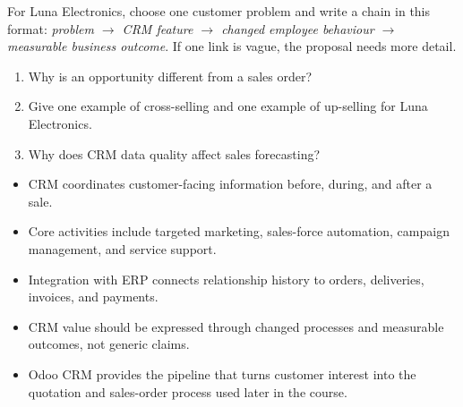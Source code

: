 \begin{tryit}
For Luna Electronics, choose one customer problem and write a chain in this format: \emph{problem $\rightarrow$ CRM feature $\rightarrow$ changed employee behaviour $\rightarrow$ measurable business outcome}. If one link is vague, the proposal needs more detail.
\end{tryit}

\begin{quickcheck}
\begin{enumerate}
  \item Why is an opportunity different from a sales order?
  \item Give one example of cross-selling and one example of up-selling for Luna Electronics.
  \item Why does CRM data quality affect sales forecasting?
\end{enumerate}
\end{quickcheck}

\begin{chapterrecap}
\begin{itemize}
  \item CRM coordinates customer-facing information before, during, and after a sale.
  \item Core activities include targeted marketing, sales-force automation, campaign management, and service support.
  \item Integration with ERP connects relationship history to orders, deliveries, invoices, and payments.
  \item CRM value should be expressed through changed processes and measurable outcomes, not generic claims.
  \item Odoo CRM provides the pipeline that turns customer interest into the quotation and sales-order process used later in the course.
\end{itemize}
\end{chapterrecap}
